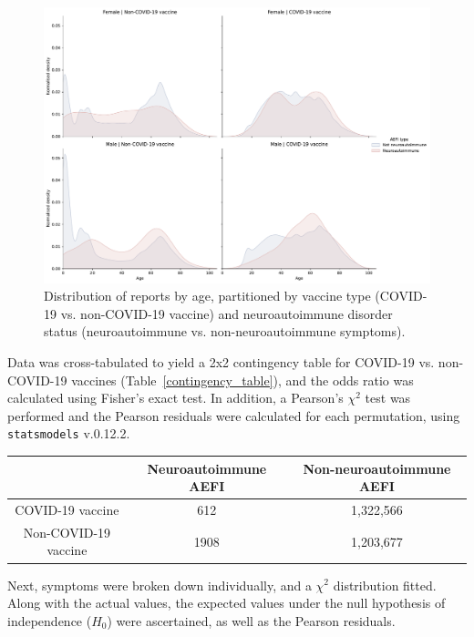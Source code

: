 \documentclass[idr,communication,submit,oneauthor,pdftex]{Definitions/mdpi}
\begin{document}
\begin{figure}[H]
\includegraphics[width=12.5 cm]{age_distribution}
\caption{Distribution of reports by age, partitioned by vaccine type (COVID-19 vs. non-COVID-19 vaccine) and
neuroautoimmune disorder status (neuroautoimmune vs. non-neuroautoimmune symptoms).\label{distribution_by_age}}
\end{figure}

Data was cross-tabulated to yield a 2x2 contingency table for COVID-19 vs. non-COVID-19 vaccines
(Table~\ref{contingency_table}), and the odds ratio was calculated using Fisher's exact test. In addition, a
Pearson's $\chi^2$ test was performed and the Pearson residuals were calculated for each permutation, using
\texttt{statsmodels} v.0.12.2.\cite{seabold2010statsmodels}

\begin{specialtable}[H]
\caption{2x2 contingency table by vaccine type (COVID-19 vs. non-COVID-19 vaccine) and neuroautoimmune
disorder status.\label{contingency_table}}
\begin{tabular}{ccc}
\toprule
& \textbf{Neuroautoimmune AEFI}	& \textbf{Non-neuroautoimmune AEFI}\\
\midrule
COVID-19 vaccine	    	& 612			    & 1,322,566  \\
Non-COVID-19 vaccine		& 1908              & 1,203,677 \\
\bottomrule
\end{tabular}
\end{specialtable}

Next, symptoms were broken down individually, and a $\chi^2$ distribution fitted. Along with the actual values, the
expected values under the null hypothesis of independence ($H_0$) were ascertained, as well as the Pearson residuals.
\end{document}
